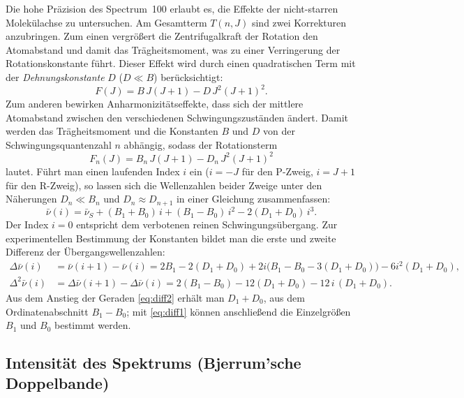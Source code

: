 \documentclass[11pt,a4paper]{article}
\newcommand{\wz}{\ensuremath{\bar{\nu}}}          %
\newcommand{\wzs}{\ensuremath{\bar{\nu}_S}}        %
\begin{document}
Die hohe Präzision des Spectrum~100 erlaubt es, die Effekte der nicht-starren
Molekülachse zu untersuchen. Am Gesamtterm $T(n,J)$ sind zwei Korrekturen
anzubringen. Zum einen vergrößert die Zentrifugalkraft der Rotation den
Atomabstand und damit das Trägheitsmoment, was zu einer Verringerung der
Rotationskonstante führt. Dieser Effekt wird durch einen quadratischen Term mit
der \emph{Dehnungskonstante} $D$ ($D \ll B$) berücksichtigt:
\begin{equation}
  F(J) = B\,J(J+1) - D\,J^2(J+1)^2 .
  \label{eq:zentrifugal}
\end{equation}
Zum anderen bewirken Anharmonizitätseffekte, dass sich der mittlere Atomabstand
zwischen den verschiedenen Schwingungszuständen ändert. Damit werden das
Trägheitsmoment und die Konstanten $B$ und $D$ von der Schwingungsquantenzahl $n$
abhängig, sodass der Rotationsterm
\begin{equation}
  F_n(J) = B_n\,J(J+1) - D_n\,J^2(J+1)^2
\end{equation}
lautet. Führt man einen laufenden Index $i$ ein ($i = -J$ für den P-Zweig,
$i = J+1$ für den R-Zweig), so lassen sich die Wellenzahlen beider Zweige unter
den Näherungen $D_n \ll B_n$ und $D_n \approx D_{n+1}$ in einer Gleichung
zusammenfassen:
\begin{equation}
  \wz(i) = \wzs + (B_1 + B_0)\,i + (B_1 - B_0)\,i^2 - 2(D_1 + D_0)\,i^3 .
  \label{eq:sammel}
\end{equation}
Der Index $i = 0$ entspricht dem verbotenen reinen Schwingungsübergang. Zur
experimentellen Bestimmung der Konstanten bildet man die erste und zweite
Differenz der Übergangswellenzahlen:
\begin{align}
  \Delta\wz(i)   &= \wz(i+1) - \wz(i)
    = 2B_1 - 2(D_1 + D_0) + 2i\bigl(B_1 - B_0 - 3(D_1 + D_0)\bigr) - 6i^2(D_1+D_0),
    \label{eq:diff1}\\
  \Delta^2\wz(i) &= \Delta\wz(i+1) - \Delta\wz(i)
    = 2(B_1 - B_0) - 12(D_1 + D_0) - 12\,i\,(D_1 + D_0) .
    \label{eq:diff2}
\end{align}
Aus dem Anstieg der Geraden \eqref{eq:diff2} erhält man $D_1 + D_0$, aus dem
Ordinatenabschnitt $B_1 - B_0$; mit \eqref{eq:diff1} können anschließend die
Einzelgrößen $B_1$ und $B_0$ bestimmt werden.

\subsection{Intensität des Spektrums (Bjerrum'sche Doppelbande)}
\label{sec:intensitaet}
\end{document}
